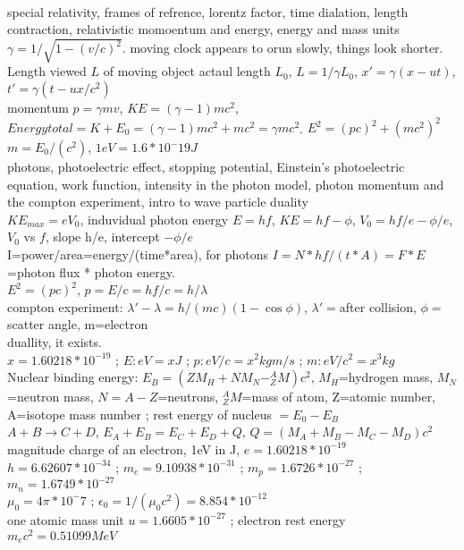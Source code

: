 \documentclass{article}
\begin{document}
\\\indent special relativity, frames of refrence, lorentz factor, time dialation, length contraction, relativistic momoentum and energy, energy and mass units
\\$\gamma=1/\sqrt{1-(v/c)^2}$. moving clock appears to orun slowly, things look shorter. Length viewed $L$ of moving object actaul length $L_0$, $L=1/\gamma L_0$, $x'=\gamma(x-ut)$, $t'=\gamma(t-ux/c^2)$
\\momentum $p=\gamma mv$, $KE=(\gamma-1)mc^2$, $Energy total=K+E_0=(\gamma-1)mc^2+mc^2=\gamma mc^2$. $E^2=(pc)^2+(mc^2)^2$
\\$m=E_0/(c^2)$, $1eV=1.6*10^-19 J$
\\\indent photons, photoelectric effect, stopping potential, Einstein's photoelectric equation, work function, intensity in the photon model, photon momentum and the compton experiment, intro to wave particle duality
\\$KE_{max}=eV_0$, induvidual photon energy $E=hf$, $KE=hf-\phi$, $V_0=hf/e-\phi/e$, $V_0$ vs $f$, slope h/e, intercept $-\phi/e$
\\I=power/area=energy/(time*area), for photons $I=N*hf/(t*A)=F*E$=photon flux * photon energy.
\\$E^2=(pc)^2$, $p=E/c=hf/c=h/\lambda$
\\compton experiment: $\lambda'-\lambda=h/(mc)(1-\cos\phi)$, $\lambda'=$after collision, $\phi=$scatter angle, m=electron
\\duallity, it exists.
\\$x=1.60218*10^{-19}$ ; $E: eV=x J$ ; $p: eV/c = x^2 kg m/s$ ; $m: eV/c^2=x^3 kg$
\\Nuclear binding energy: $E_B=(ZM_H+NM_N-^A_ZM)c^2$, $M_H$=hydrogen mass, $M_N$=neutron mass, $N=A-Z$=neutrons, $^A_ZM$=mass of atom, Z=atomic number, A=isotope mass number ; rest energy of nucleus $=E_0-E_B$
\\$A+B\rightarrow C+D$, $E_A+E_B=E_C+E_D+Q$, $Q=(M_A+M_B-M_C-M_D)c^2$
\\magnitude charge of an electron, 1eV in J, $e=1.60218*10^{-19}$
\\$h=6.62607*10^{-34}$ ; $m_e=9.10938*10^{-31}$ ; $m_p=1.6726*10^{-27}$ ; $m_n=1.6749*10^{-27}$
\\$\mu_0=4\pi*10^-7$ ; $\epsilon_0=1/(\mu_0c^2)=8.854*10^{-12}$
\\one atomic mass unit $u=1.6605*10^{-27}$ ; electron rest energy $m_ec^2=0.51099MeV$




\end{document}
